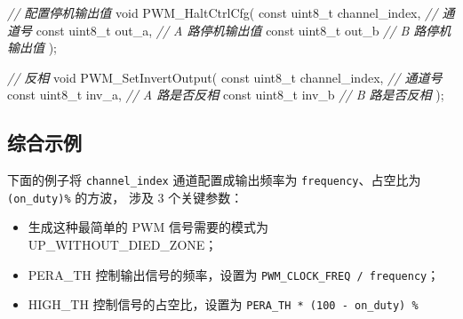 \documentclass[
  12pt,
]{book}
\newenvironment{Shaded}{\begin{snugshade}}{\end{snugshade}}
\newcommand{\CommentTok}[1]{\textcolor[rgb]{0.56,0.35,0.01}{\textit{#1}}}
\newcommand{\DataTypeTok}[1]{\textcolor[rgb]{0.13,0.29,0.53}{#1}}
\newcommand{\NormalTok}[1]{#1}
\begin{document}
\begin{Shaded}
\begin{Highlighting}[]
\CommentTok{// 配置停机输出值}
\DataTypeTok{void}\NormalTok{ PWM_HaltCtrlCfg(}
    \DataTypeTok{const} \DataTypeTok{uint8_t}\NormalTok{ channel_index,    }\CommentTok{// 通道号}
    \DataTypeTok{const} \DataTypeTok{uint8_t}\NormalTok{ out_a,            }\CommentTok{// A 路停机输出值}
    \DataTypeTok{const} \DataTypeTok{uint8_t}\NormalTok{ out_b             }\CommentTok{// B 路停机输出值}
\NormalTok{    );}
\end{Highlighting}
\end{Shaded}

\begin{Shaded}
\begin{Highlighting}[]
\CommentTok{// 反相}
\DataTypeTok{void}\NormalTok{ PWM_SetInvertOutput(}
    \DataTypeTok{const} \DataTypeTok{uint8_t}\NormalTok{ channel_index,    }\CommentTok{// 通道号}
    \DataTypeTok{const} \DataTypeTok{uint8_t}\NormalTok{ inv_a,            }\CommentTok{// A 路是否反相}
    \DataTypeTok{const} \DataTypeTok{uint8_t}\NormalTok{ inv_b             }\CommentTok{// B 路是否反相}
\NormalTok{    );}
\end{Highlighting}
\end{Shaded}

\hypertarget{ux7efcux5408ux793aux4f8b}{%
\subsection{综合示例}\label{ux7efcux5408ux793aux4f8b}}

下面的例子将 \texttt{channel\_index} 通道配置成输出频率为 \texttt{frequency}、占空比为 \texttt{(on\_duty)\%} 的方波，
涉及 3 个关键参数：

\begin{itemize}
\item
  生成这种最简单的 PWM 信号需要的模式为 UP\_WITHOUT\_DIED\_ZONE；
\item
  PERA\_TH 控制输出信号的频率，设置为 \texttt{PWM\_CLOCK\_FREQ\ /\ frequency}；
\item
  HIGH\_TH 控制信号的占空比，设置为 \texttt{PERA\_TH\ *\ (100\ -\ on\_duty)\ \%}
\end{itemize}
\end{document}

